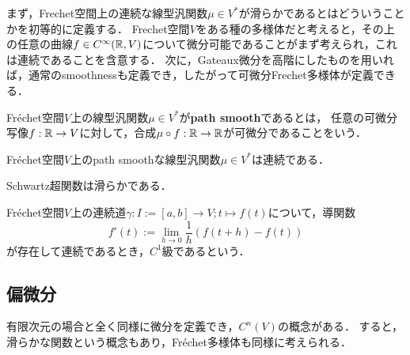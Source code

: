 \documentclass[uplatex,dvipdfmx]{jsreport}
\begin{document}
\begin{tcolorbox}[colframe=ForestGreen, colback=ForestGreen!10!white,breakable,colbacktitle=ForestGreen!40!white,coltitle=black,fonttitle=\bfseries\sffamily,
title=]
    まず，Frechet空間上の連続な線型汎関数$\mu\in V^*$が滑らかであるとはどういうことかを初等的に定義する．
    Frechet空間$V$をある種の多様体だと考えると，その上の任意の曲線$f\in C^\infty(\mathbb{R},V)$について微分可能であることがまず考えられ，これは連続であることを含意する．
    次に，Gateaux微分を高階にしたものを用いれば，通常のsmoothnessも定義でき，したがって可微分Frechet多様体が定義できる．
\end{tcolorbox}

\begin{definition}
    Fréchet空間$V$上の線型汎関数$\mu\in V^*$が\textbf{path smooth}であるとは，
    任意の可微分写像$f:\mathbb{R}\to V$に対して，合成$\mu\circ f:\mathbb{R}\to\mathbb{R}$が可微分であることをいう．
\end{definition}

\begin{proposition}
    Fréchet空間$V$上のpath smoothな線型汎関数$\mu\in V^*$は連続である．
\end{proposition}

\begin{corollary}
    Schwartz超関数は滑らかである．
\end{corollary}

\begin{definition}[曲線の微分]
    Fréchet空間$V$上の連続道$\gamma:I:=[a,b]\to V;t\mapsto f(t)$について，導関数
    \[f'(t):=\lim_{h\to0}\frac{1}{h}(f(t+h)-f(t))\]
    が存在して連続であるとき，$C^1$級であるという．
\end{definition}

\subsection{偏微分}

\begin{tcolorbox}[colframe=ForestGreen, colback=ForestGreen!10!white,breakable,colbacktitle=ForestGreen!40!white,coltitle=black,fonttitle=\bfseries\sffamily,
title=]
    有限次元の場合と全く同様に微分を定義でき，$C^n(V)$の概念がある．
    すると，滑らかな関数という概念もあり，Fréchet多様体も同様に考えられる．
\end{tcolorbox}
\end{document}
